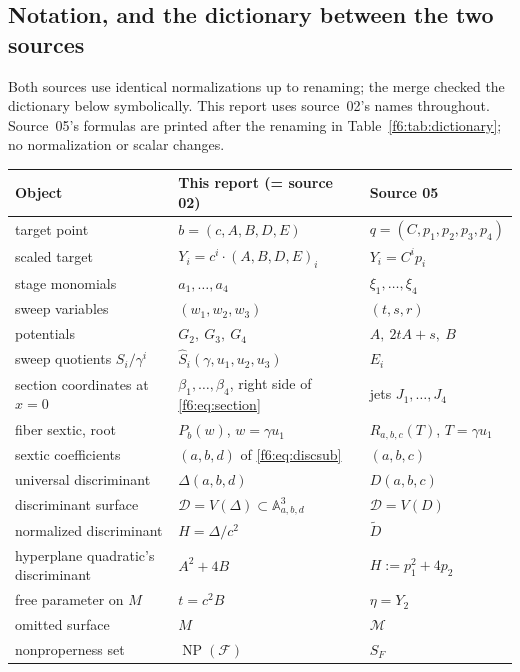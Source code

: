 \documentclass[11pt,a4paper]{article}
\theoremstyle{definition}
\newcommand{\A}{\mathbb A}
\newcommand{\F}{\mathcal F}
\newcommand{\NP}{\operatorname{NP}}
\newcommand{\dd}{\mathcal D}
\begin{document}
\subsection{Notation, and the dictionary between the two sources}
\label{f6:sec:dictionary}
Both sources use identical normalizations up to renaming; the merge checked
the dictionary below symbolically. This report uses source~02's names
throughout. Source~05's formulas are printed after the renaming in
Table~\ref{f6:tab:dictionary}; no normalization or scalar changes.

\begin{table}[htbp]
\centering\small
\renewcommand{\arraystretch}{1.25}
\begin{tabularx}{\textwidth}{@{}>{\raggedright\arraybackslash}p{}>{\raggedright\arraybackslash}p{}X@{}}
\toprule
Object & This report (= source 02) & Source 05\\
\midrule
target point & $b=(c,A,B,D,E)$ & $q=(C,p_1,p_2,p_3,p_4)$\\
scaled target & $Y_i=c^i\cdot(A,B,D,E)_i$ & $Y_i=C^ip_i$\\
stage monomials & $a_1,\dots,a_4$ & $\xi_1,\dots,\xi_4$\\
sweep variables & $(w_1,w_2,w_3)$ & $(t,s,r)$\\
potentials & $G_2,\ G_3,\ G_4$ & $A,\ 2tA+s,\ B$\\
sweep quotients $S_i/\gamma^i$ & $\widehat S_i(\gamma,u_1,u_2,u_3)$ & $E_i$\\
section coordinates at $x=0$ & $\beta_1,\dots,\beta_4$, right side of \eqref{f6:eq:section} & jets $J_1,\dots,J_4$\\
fiber sextic, root & $P_b(w)$, $w=\gamma u_1$ & $R_{a,b,c}(T)$, $T=\gamma u_1$\\
sextic coefficients & $(a,b,d)$ of \eqref{f6:eq:discsub} & $(a,b,c)$\\
universal discriminant & $\Delta(a,b,d)$ & $D(a,b,c)$\\
discriminant surface & $\dd=V(\Delta)\subset\A^3_{a,b,d}$ & $\mathcal D=V(D)$\\
normalized discriminant & $H=\Delta/c^2$ & $\widetilde D$\\
hyperplane quadratic's discriminant & $A^2+4B$ & $H:=p_1^2+4p_2$\\
free parameter on $M$ & $t=c^2B$ & $\eta=Y_2$\\
omitted surface & $M$ & $\mathcal M$\\
nonproperness set & $\NP(\F)$ & $S_{F}$\\

\end{tabularx}
\end{table}
\end{document}
